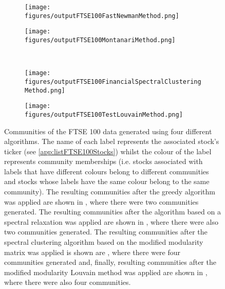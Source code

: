 \begin{figure}
\centering
	\begin{subfigure}{.5\textwidth}
		\centering
		\texttt{[image: figures/outputFTSE100FastNewmanMethod.png]}
		\caption{}
		\label{fig:outputCommunitiesGreedy}
	\end{subfigure}%
	\begin{subfigure}{.5\textwidth}
		\centering
		\texttt{[image: figures/outputFTSE100MontanariMethod.png]}
		\caption{}
		\label{fig:outputCommunitiesSpectralRelaxation}
	\end{subfigure}\\
	\begin{subfigure}{.5\textwidth}
		\centering
		\texttt{[image: figures/outputFTSE100FinancialSpectralClusteringMethod.png]}
		\caption{}
		\label{fig:outputCommunitiesSpectralClustering}
	\end{subfigure}%
	\begin{subfigure}{.5\textwidth}
		\centering
		\texttt{[image: figures/outputFTSE100TestLouvainMethod.png]}
		\caption{}
		\label{fig:outputCommunitiesTestLouvainMethod}
	\end{subfigure}
	\caption[Communities of the FTSE 100 data generated using four different algorithms.]{\label{fig:outputFTSE100} Communities of the FTSE 100 data generated using four different algorithms. The name of each label represents the associated stock's ticker (see \cref{app:listFTSE100Stocks}) whilst the colour of the label represents community memberships (i.e. stocks associated with labels that have different colours belong to different communities and stocks whose labels have the same colour belong to the same community). The resulting communities after the greedy algorithm was applied are shown in , where there were two communities generated. The resulting communities after the algorithm based on a spectral relaxation was applied are shown in , where there were also two communities generated. The resulting communities after the spectral clustering algorithm based on the modified modularity matrix was applied is shown are , where there were four communities generated and, finally, resulting communities after the modified modularity Louvain method was applied are shown in , where there were also four communities.}
\end{figure}

